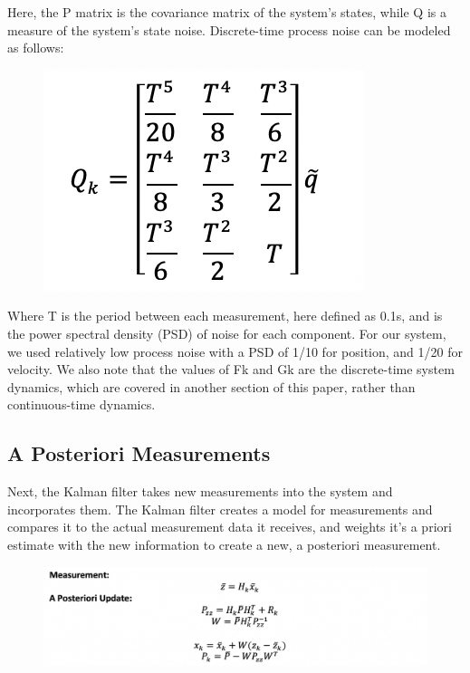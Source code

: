 \documentclass[12pt,onecolumn,reqno]{amsart}
\begin{document}
Here, the P matrix is the covariance matrix of the system's states, while Q is a
measure of the system's state noise. Discrete-time process noise can be modeled
as follows:

\begin{figure}[H]
	\includegraphics{Q.png}
	\label{fig:Q Matrix}
\end{figure}

Where T is the period between each measurement, here defined as 0.1s, and  is
the power spectral density (PSD) of noise for each component. For our system, we
used relatively low process noise with a PSD of 1/10 for position, and 1/20 for
velocity. We also note that the values of Fk and Gk are the discrete-time system
dynamics, which are covered in another section of this paper, rather than
continuous-time dynamics. 

\subsection{A Posteriori Measurements}
Next, the Kalman filter takes new measurements into the system and incorporates
them. The Kalman filter creates a model for measurements and compares it to the
actual measurement data it receives, and weights it's a priori estimate with the
new information to create a new, a posteriori measurement.

\begin{figure}[H]
	\includegraphics{a_post.png}
	\label{fig:A Posteriori Measurements}
\end{figure}
\end{document}
